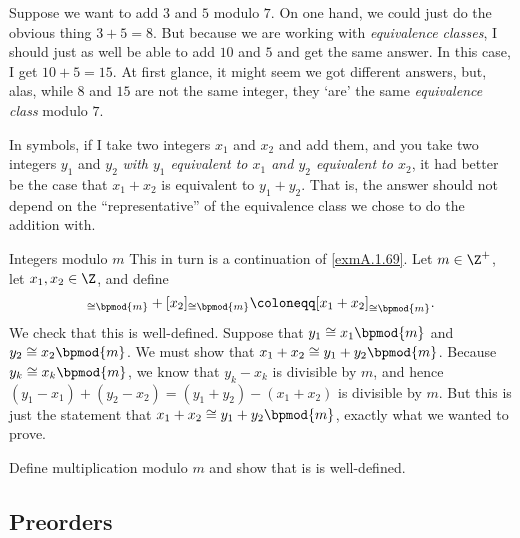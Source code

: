 Suppose we want to add $3$ and $5$ modulo $7$.  On one hand, we could just do the obvious thing $3+5=8$.  But because we are working with \emph{equivalence classes}, I should just as well be able to add $10$ and $5$ and get the same answer.  In this case, I get $10+5=15$.  At first glance, it might seem we got different answers, but, alas, while $8$ and $15$ are not the same integer, they `are' the same \emph{equivalence class} modulo $7$.

In symbols, if I take two integers $x_1$ and $x_2$ and add them, and you take two integers $y_1$ and $y_2$ \emph{with $y_1$ equivalent to $x_1$ and $y_2$ equivalent to $x_2$}, it had better be the case that $x_1+x_2$ is equivalent to $y_1+y_2$.  That is, the answer should not depend on the ``representative'' of the equivalence class we chose to do the addition with.
\begin{exm}{Integers modulo $m$}{}
This in turn is a continuation of \cref{exmA.1.69}.  Let $m\in \Z ^+$, let $x_1,x_2\in \Z$, and define
\begin{equation}
[x_1]_{\cong \bpmod{m}}+[x_2]_{\cong \bpmod{m}}\coloneqq [x_1+x_2]_{\cong \bpmod{m}}.
\end{equation}
We check that this is well-defined.  Suppose that $y_1\cong x_1\bpmod{m}$ and $y_2\cong x_2\bpmod{m}$.  We must show that $x_1+x_2\cong y_1+y_2\bpmod{m}$.  Because $y_k\cong x_k\bpmod{m}$, we know that $y_k-x_k$ is divisible by $m$, and hence $(y_1-x_1)+(y_2-x_2)=(y_1+y_2)-(x_1+x_2)$ is divisible by $m$.  But this is just the statement that $x_1+x_2\cong y_1+y_2\bpmod{m}$, exactly what we wanted to prove.
\begin{exr}[breakable=false]{}{}
Define multiplication modulo $m$ and show that is is well-defined.
\end{exr}
\end{exm}

\subsection{Preorders}

